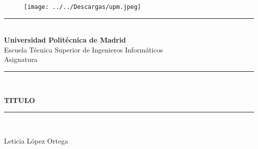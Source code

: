 \documentclass[10pt,a4paper]{article}
\begin{document}
    
    \begin{titlepage}
        \begin{center}
        
		\vspace*{-1in}

		\begin{figure}[htb]
		\begin{center}
			\texttt{[image: ../../Descargas/upm.jpeg]} 
		\end{center}
		\end{figure}
		\begin{large}
			\rule{100mm}{0.1mm}\\
		  	\vspace*{0.10in}
			\textbf{Universidad Politécnica de Madrid}\\
			\vspace*{0.10in}
			 Escuela Técnica Superior de Ingenieros Informáticos\\
            \vspace*{0.10in}
             Asignatura\\
            \vspace*{0.30in}
            \rule{80mm}{0.1mm}\\
            \vspace*{0.2in}
		\end{large}
		   
            \begin{Large}
                \textbf{TITULO} \\
            \end{Large}        
            \vspace*{0.2in}

            \rule{80mm}{0.1mm}\\
            \vspace*{0.2in}    
            \begin{large}
                Leticia López Ortega \\
                \vspace*{0.2in}
     
            \end{large}
            
        \end{center}
        
\end{titlepage}
    
\cleardoublepage

\tableofcontents{}
\cleardoublepage
    
\end{document}
